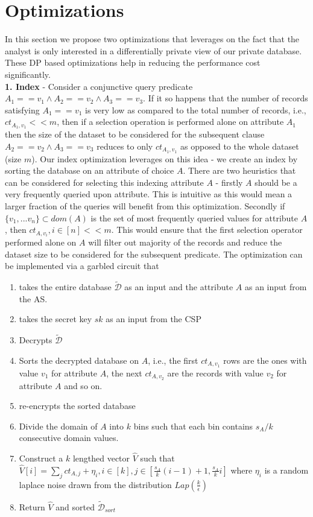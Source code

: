 \section{Optimizations}
In this section we propose two optimizations that leverages on the fact that the analyst is only interested in a  differentially private view of our private database. These DP based optimizations help in reducing the performance cost significantly. %
\\\textbf{1. Index} - Consider a conjunctive query predicate $A_1==v_1 \wedge A_2==v_2 \wedge A_3==v_3 $. If it so happens that the number of records satisfying $A_1==v_1$ is very low as compared to the total number of records, i.e., $ct_{A_1,v_1} << m$, then if a selection operation is performed alone on attribute $A_1$ then the size of the dataset to be considered for the subsequent clause $A_2==v_2 \wedge A_3==v_3$ reduces to only $ct_{A_1,v_1}$ as opposed to the whole dataset (size $m$). Our index optimization leverages on this idea - we create an index by sorting the database on an attribute of choice $A$. There are two heuristics that can be considered for selecting this indexing attribute $A$ - firstly $A$ should be a very frequently queried upon attribute. This is intuitive as this would mean a larger fraction of the queries will benefit from this optimization. Secondly if $\{v_1,...v_n\} \subset dom(A)$ is the set of most frequently queried values for attribute $A$, then $ct_{A,v_i}, i \in [n] << m$. This would ensure that the first selection operator performed alone on $A$ will filter out majority of the records and reduce the  dataset size to be considered for the subsequent predicate. 
The optimization can be implemented via a garbled circuit that \begin{enumerate}\item takes the entire database $\boldsymbol{\mathcal{\tilde{D}}}$ as an input and the attribute $A$ as an input from the \textsf{AS}.
\item takes the secret key $sk$ as an input from  the \textsf{CSP} \item Decrypts $\boldsymbol{\mathcal{\tilde{D}}}$ \item Sorts the decrypted database on $A$, i.e., the first $ct_{A,v_1}$ rows are the ones with value $v_1$ for attribute $A$, the next $ct_{A,v_2}$ are  the records with value $v_2$ for attribute $A$ and so on. \item  re-encrypts the sorted database \item Divide the domain of $A$ into $k$ bins such that each bin contains $s_A/k$ consecutive domain values. \item Construct a $k$ lengthed vector $\hat{V}$ such that $\hat{V}[i]=\sum_jct_{A,j}+\eta_i, i \in [k], j \in [\frac{s_A}{k}(i-1)+1,\frac{s_A}{k}i]$ where $\eta_i$ is a random laplace noise drawn from the distribution $Lap(\frac{k}{\epsilon})$ \item Return $\hat{V}$ and sorted $\boldsymbol{\mathcal{\tilde{D}}}_{sort}$\end{enumerate}

